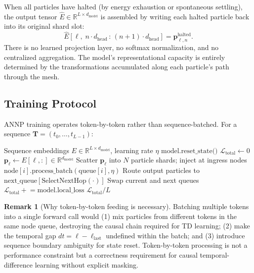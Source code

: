 \documentclass[11pt,a4paper]{article}
\theoremstyle{definition}
\newtheorem{remark}{Remark}[section]
\newcommand{\vp}{\mathbf{p}}
\newcommand{\R}{\mathbb{R}}
\begin{document}
When all particles have halted (by energy exhaustion or spontaneous settling),
the output tensor $\hat{E} \in \R^{L \times d_\text{model}}$ is assembled by writing each
halted particle back into its original shard slot:
\begin{equation}
  \hat{E}[\ell,\; n \cdot d_\text{head}\,:\,(n{+}1)\cdot d_\text{head}] = \vp_{\ell,n}^\text{halted}.
  \label{eq:recon}
\end{equation}
There is no learned projection layer, no softmax normalization, and no centralized aggregation.
The model's representational capacity is entirely determined by the transformations accumulated
along each particle's path through the mesh.

\subsection{Training Protocol}
\label{sec:training}

ANNP training operates token-by-token rather than sequence-batched.
For a sequence $\mathbf{T} = (t_0, \ldots, t_{L-1})$:

\begin{algorithm}[ht]
\caption{ANNP Training Step (one sequence)}
\label{alg:training}
\begin{algorithmic}[1]
  \Require Sequence embeddings $E \in \R^{L \times d_\text{model}}$, learning rate $\eta$
  \State $\text{model.reset\_state()}$ 
  \State $\mathcal{L}_\text{total} \gets 0$
    \State $\vp_\ell \gets E[\ell, :] \in \R^{d_\text{model}}$ 
    \State Scatter $\vp_\ell$ into $N$ particle shards; inject at ingress nodes
    \Repeat
        \State $\text{node}[i].\text{process\_batch}(\text{queue}[i], \eta)$
        \State Route output particles to $\text{next\_queue}[\text{SelectNextHop}(\cdot)]$
      \EndFor
      \State Swap current and next queues
    \State $\mathcal{L}_\text{total} \mathrel{+}= \text{model.local\_loss}$
  \EndFor
  \State \Return $\mathcal{L}_\text{total} / L$
\end{algorithmic}
\end{algorithm}

\begin{remark}[Why token-by-token feeding is necessary]
  Batching multiple tokens into a single forward call would (1) mix particles from different
  tokens in the same node queue, destroying the causal chain required for TD learning;
  (2) make the temporal gap $dt = \ell - \ell_\text{last}$ undefined within the batch;
  and (3) introduce sequence boundary ambiguity for state reset.
  Token-by-token processing is not a performance constraint but a correctness requirement
  for causal temporal-difference learning without explicit masking.
\end{remark}
\end{document}
